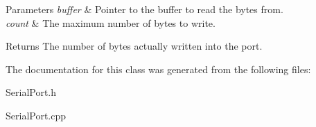 \begin{DoxyParams}{\-Parameters}
{\em buffer} & \-Pointer to the buffer to read the bytes from. \\
\hline
{\em count} & \-The maximum number of bytes to write. \\
\hline
\end{DoxyParams}
\begin{DoxyReturn}{\-Returns}
\-The number of bytes actually written into the port. 
\end{DoxyReturn}


\-The documentation for this class was generated from the following files\-:\begin{DoxyCompactItemize}
\item 
\-Serial\-Port.\-h\item 
\-Serial\-Port.\-cpp\end{DoxyCompactItemize}
